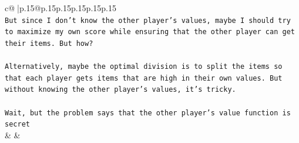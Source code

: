 \documentclass{article}
\begin{document}
{\begin{supertabular}{c@{$\;$}|p{.15\linewidth}@{}p{.15\linewidth}p{.15\linewidth}p{.15\linewidth}p{.15\linewidth}p{.15\linewidth}}
{{{\\ 
\texttt{But since I don't know the other player's values, maybe I should try to maximize my own score while ensuring that the other player can get their items. But how?} \\
\\ 
\texttt{Alternatively, maybe the optimal division is to split the items so that each player gets items that are high in their own values. But without knowing the other player's values, it's tricky.} \\
\\ 
\texttt{Wait, but the problem says that the other player's value function is secret} \\
            }
        }
    }
    & & \\ \\


\end{supertabular}}
\end{document}
